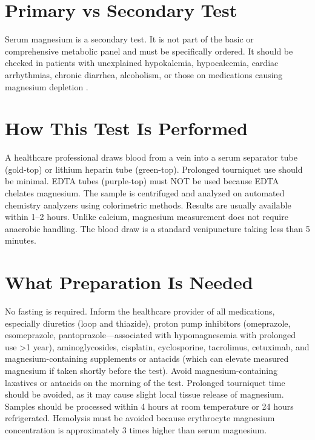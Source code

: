 \section*{Primary vs Secondary Test}
Serum magnesium is a secondary test. It is not part of the basic or comprehensive metabolic panel and must be specifically ordered. It should be checked in patients with unexplained hypokalemia, hypocalcemia, cardiac arrhythmias, chronic diarrhea, alcoholism, or those on medications causing magnesium depletion \cite{tierney2023current}.

\section*{How This Test Is Performed}
A healthcare professional draws blood from a vein into a serum separator tube (gold-top) or lithium heparin tube (green-top). Prolonged tourniquet use should be minimal. EDTA tubes (purple-top) must NOT be used because EDTA chelates magnesium. The sample is centrifuged and analyzed on automated chemistry analyzers using colorimetric methods. Results are usually available within 1--2 hours. Unlike calcium, magnesium measurement does not require anaerobic handling. The blood draw is a standard venipuncture taking less than 5 minutes.

\section*{What Preparation Is Needed}
No fasting is required. Inform the healthcare provider of all medications, especially diuretics (loop and thiazide), proton pump inhibitors (omeprazole, esomeprazole, pantoprazole---associated with hypomagnesemia with prolonged use >1 year), aminoglycosides, cisplatin, cyclosporine, tacrolimus, cetuximab, and magnesium-containing supplements or antacids (which can elevate measured magnesium if taken shortly before the test). Avoid magnesium-containing laxatives or antacids on the morning of the test. Prolonged tourniquet time should be avoided, as it may cause slight local tissue release of magnesium. Samples should be processed within 4 hours at room temperature or 24 hours refrigerated. Hemolysis must be avoided because erythrocyte magnesium concentration is approximately 3 times higher than serum magnesium.

